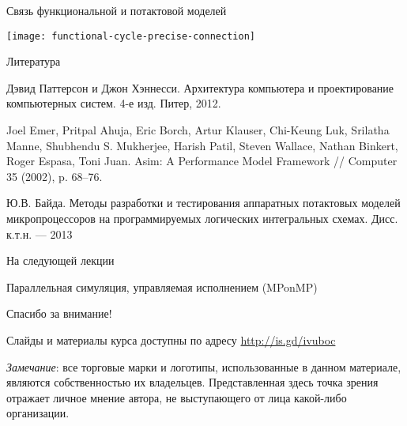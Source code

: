 \begin{frame}{Связь функциональной и потактовой моделей}

\centering\texttt{[image: functional-cycle-precise-connection]}

\end{frame}

% 


\begin{frame}[allowframebreaks]{Литература}
\begin{thebibliography}{99}
     Дэвид Паттерсон и Джон Хэннесси. Архитектура компьютера и проектирование компьютерных
систем. 4-е изд. Питер, 2012.

 Joel Emer, Pritpal Ahuja, Eric Borch, Artur Klauser, Chi-Keung Luk, Srilatha Manne, Shubhendu S. Mukherjee,
Harish Patil, Steven Wallace, Nathan Binkert, Roger Espasa, Toni Juan. Asim: A Performance Model Framework // Computer 35 (2002), p. 68–76.

 Ю.В. Байда. Методы разработки и тестирования аппаратных потактовых моделей микропроцессоров на программируемых логических интегральных схемах. Дисс. к.т.н. — 2013
\end{thebibliography}
\end{frame}

\begin{frame}{На следующей лекции}
\centering

Параллельная симуляция, управляемая исполнением (MPonMP)

\end{frame}


\begin{frame}

{\huge{Спасибо за внимание!}\par}

\vfill

Слайды и материалы курса доступны по адресу \url{http://is.gd/ivuboc} %

\vfill

\tiny{\textit{Замечание}: все торговые марки и логотипы, использованные в данном материале, являются собственностью их владельцев. Представленная здесь точка зрения отражает личное мнение автора, не выступающего от лица какой-либо организации.}

\end{frame}


